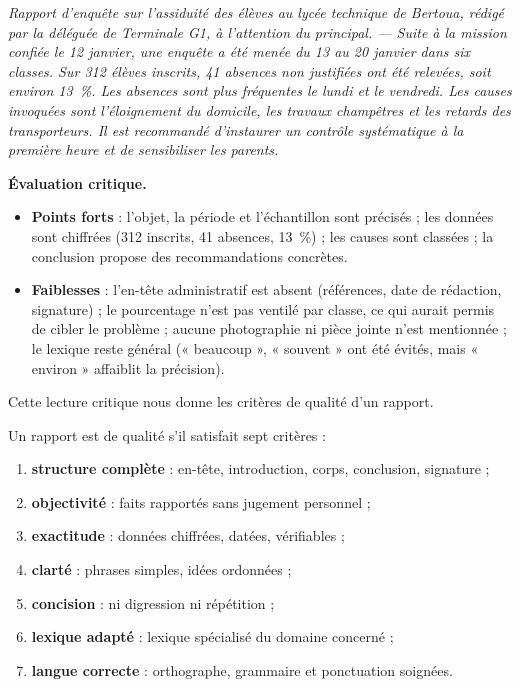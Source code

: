 \documentclass[11pt]{article}
\begin{document}
\begin{exemplebox}
\emph{Rapport d'enquête sur l'assiduité des élèves au lycée technique de Bertoua, rédigé par la déléguée de Terminale G1, à l'attention du principal. — Suite à la mission confiée le 12 janvier, une enquête a été menée du 13 au 20 janvier dans six classes. Sur 312 élèves inscrits, 41 absences non justifiées ont été relevées, soit environ 13~\%. Les absences sont plus fréquentes le lundi et le vendredi. Les causes invoquées sont l'éloignement du domicile, les travaux champêtres et les retards des transporteurs. Il est recommandé d'instaurer un contrôle systématique à la première heure et de sensibiliser les parents.}
\end{exemplebox}

\textbf{Évaluation critique.}\par
\begin{itemize}
\item \textbf{Points forts} : l'objet, la période et l'échantillon sont précisés ; les données sont chiffrées (312 inscrits, 41 absences, 13~\%) ; les causes sont classées ; la conclusion propose des recommandations concrètes.
\item \textbf{Faiblesses} : l'en-tête administratif est absent (références, date de rédaction, signature) ; le pourcentage n'est pas ventilé par classe, ce qui aurait permis de cibler le problème ; aucune photographie ni pièce jointe n'est mentionnée ; le lexique reste général (« beaucoup », « souvent » ont été évités, mais « environ » affaiblit la précision).
\end{itemize}

Cette lecture critique nous donne les critères de qualité d'un rapport.

\begin{propriete}
Un rapport est de qualité s'il satisfait sept critères :
\begin{enumerate}
\item \textbf{structure complète} : en-tête, introduction, corps, conclusion, signature ;
\item \textbf{objectivité} : faits rapportés sans jugement personnel ;
\item \textbf{exactitude} : données chiffrées, datées, vérifiables ;
\item \textbf{clarté} : phrases simples, idées ordonnées ;
\item \textbf{concision} : ni digression ni répétition ;
\item \textbf{lexique adapté} : lexique spécialisé du domaine concerné ;
\item \textbf{langue correcte} : orthographe, grammaire et ponctuation soignées.
\end{enumerate}
\end{propriete}
\end{document}
